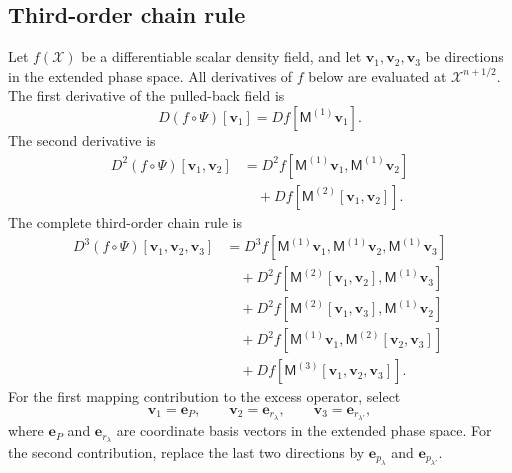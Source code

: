 \documentclass[
  11pt,
  letterpaper,
  onehalfspacing,
  normalmargins,
  equalmargins,
  oneside
]{ut-thesis}
\begin{document}
\subsection{Third-order chain rule}
\label{appsubsec:third-chain-rule}

Let \(f(\boldsymbol{\mathcal X})\) be a differentiable scalar density field,
and let \(\mathbf v_1,\mathbf v_2,\mathbf v_3\) be directions in the extended
phase space. All derivatives of \(f\) below are evaluated at
\(\boldsymbol{\mathcal X}^{n+1/2}\). The first derivative of the pulled-back
field is
\begin{equation}
D\left(f\circ\Psi\right)[\mathbf v_1]
=
Df\left[\mathsf M^{(1)}\mathbf v_1\right].
\label{appeq:pulled-first}
\end{equation}
The second derivative is
\begin{align}
D^2\left(f\circ\Psi\right)
[\mathbf v_1,\mathbf v_2]
&=
D^2f
\left[
\mathsf M^{(1)}\mathbf v_1,
\mathsf M^{(1)}\mathbf v_2
\right]
\nonumber\\
&\quad+
Df
\left[
\mathsf M^{(2)}[\mathbf v_1,\mathbf v_2]
\right].
\label{appeq:pulled-second}
\end{align}
The complete third-order chain rule is
\begin{align}
D^3\left(f\circ\Psi\right)
[\mathbf v_1,\mathbf v_2,\mathbf v_3]
&=
D^3f
\left[
\mathsf M^{(1)}\mathbf v_1,
\mathsf M^{(1)}\mathbf v_2,
\mathsf M^{(1)}\mathbf v_3
\right]
\nonumber\\
&\quad+
D^2f
\left[
\mathsf M^{(2)}[\mathbf v_1,\mathbf v_2],
\mathsf M^{(1)}\mathbf v_3
\right]
\nonumber\\
&\quad+
D^2f
\left[
\mathsf M^{(2)}[\mathbf v_1,\mathbf v_3],
\mathsf M^{(1)}\mathbf v_2
\right]
\nonumber\\
&\quad+
D^2f
\left[
\mathsf M^{(1)}\mathbf v_1,
\mathsf M^{(2)}[\mathbf v_2,\mathbf v_3]
\right]
\nonumber\\
&\quad+
Df
\left[
\mathsf M^{(3)}[\mathbf v_1,\mathbf v_2,\mathbf v_3]
\right].
\label{appeq:pulled-third}
\end{align}
For the first mapping contribution to the excess operator, select
\begin{equation}
\mathbf v_1=\mathbf e_P,
\qquad
\mathbf v_2=\mathbf e_{r_\lambda},
\qquad
\mathbf v_3=\mathbf e_{r_{\lambda'}},
\label{appeq:pulled-r-directions}
\end{equation}
where \(\mathbf e_P\) and \(\mathbf e_{r_\lambda}\) are coordinate basis
vectors in the extended phase space. For the second contribution, replace the
last two directions by
\(\mathbf e_{p_\lambda}\) and \(\mathbf e_{p_{\lambda'}}\).
\end{document}
